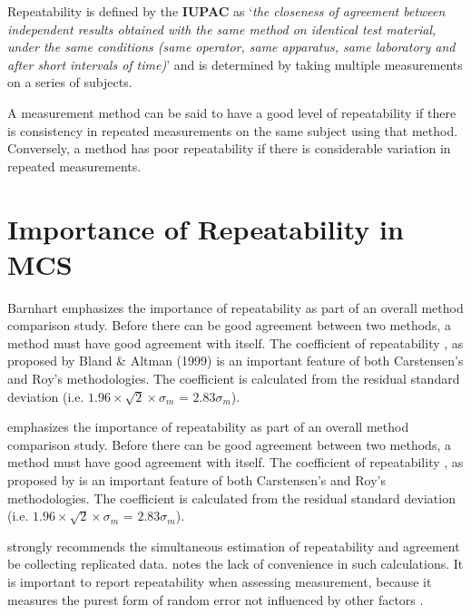\documentclass[12pt, a4paper]{article}
\begin{document}
Repeatability is defined by the \textbf{IUPAC} as `\textit{the closeness of agreement between independent results obtained with the same method on identical test material, under the same conditions (same
operator, same apparatus, same laboratory and after short intervals of time)}'  and is determined by taking multiple measurements on a series of subjects.

A measurement method can be said to have a good level of repeatability if there is consistency in repeated measurements on the same subject using that method. Conversely, a method has poor repeatability if there is considerable variation in repeated measurements.

	

\newpage
\section{Importance of Repeatability in MCS}



Barnhart emphasizes the importance of repeatability as part of an overall method comparison study. Before there can be good agreement between two methods, a method must have good agreement with itself. The coefficient of repeatability , as proposed by Bland \& Altman (1999) is an important feature of both Carstensen's and Roy's methodologies. The coefficient is calculated from the residual standard deviation (i.e. $1.96 \times \sqrt{2} \times \sigma_m$ = $2.83 \sigma_m$).


\citet{Barnhart} emphasizes the importance of repeatability as part of an overall method comparison study. Before there can be good agreement between two methods, a method must have good agreement with itself. The coefficient of repeatability , as proposed by \citet{BA99} is an important feature of both Carstensen's and Roy's methodologies. The coefficient is calculated from the residual standard deviation (i.e. $1.96 \times \sqrt{2} \times \sigma_m$ = $2.83 \sigma_m$).

\bigskip

\citet{BA99} strongly recommends the simultaneous estimation of repeatability and agreement be collecting replicated data. \citet{ARoy2009} notes the lack of convenience in such calculations.
It is important to report repeatability when assessing measurement, because it measures the purest form of random error not influenced by other factors \citep{Barnhart}.	
\end{document}

